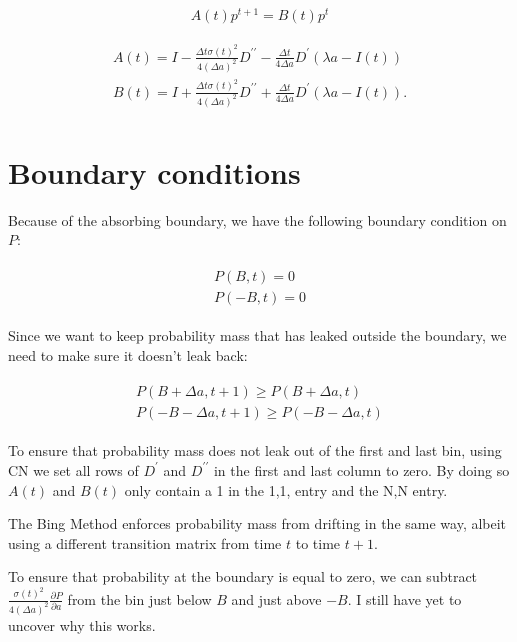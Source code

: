 \documentclass[12pt]{article}
\newcommand{\be}{\begin{equation}}
\newcommand{\ee}{\end{equation}}
\begin{document}
 \be
 A(t) p^{t+1}  = B(t) p^{t} 
 \ee
 
\begin{align}
\begin{split}
 A(t) =  I -  \frac{\Delta t \sigma(t)^2}{4{{\left(\Delta a\right)}^2}} D^{\prime \prime} - \frac{\Delta t}{4 \Delta a} D^{\prime}  \left(\lambda a - I(t) \right) 
\\
 B(t)  = I +  \frac{\Delta t \sigma(t)^2}{4{{\left(\Delta a\right)}^2}} D^{\prime \prime} + \frac{\Delta t}{4 \Delta a} D^{\prime}  \left(\lambda a - I(t) \right).
\end{split}
\end{align}

\section{Boundary conditions}

Because of the absorbing boundary, we have the following boundary condition on $P$:

\begin{align}
\begin{split}
P(B,t) = 0
\\
P(-B,t) = 0
\end{split}
\end{align}

Since we want to keep probability mass that has leaked outside the boundary, we need to make sure it doesn't leak back:

\begin{align}
\begin{split}
P(B+\Delta a,t+1) \geq P(B+\Delta a, t)
\\
P(-B-\Delta a,t+1) \geq P(-B-\Delta a, t)
\end{split}
\end{align}

To ensure that probability mass does not leak out of the first and last bin, using CN we set all rows of $D^{\prime}$ and $D^{\prime \prime}$ in the first and last column to zero. By doing so $A(t)$ and $B(t)$ only contain a 1 in the 1,1, entry and the N,N entry. 

The Bing Method enforces probability mass from drifting in the same way, albeit using a different transition matrix from time $t$ to time $t+1$. 

To ensure that probability at the boundary is equal to zero, we can subtract $\frac{\sigma(t)^2}{4{{\left(\Delta a\right)}^2}} \frac{\partial P}{\partial a}$ from the bin just below $B$ and just above $-B$. I still have yet to uncover why this works.
\end{document}
